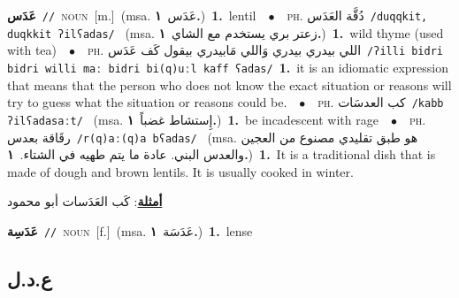\documentclass[10pt,a4paper,twoside]{article} %
\begin{document}
\begin{multicols}{2}
{\setlength\topsep{0pt}\textbf{\foreignlanguage{arabic}{عَدَس}}\ {\color{gray}\texttt{//}\color{black}}\ \textsc{noun}\ [m.]\ \color{gray}(msa. \foreignlanguage{arabic}{عَدَس}~\foreignlanguage{arabic}{\textbf{١.}})\color{black}\ \textbf{1.}~lentil\ \ $\bullet$\ \ \textsc{ph.} \color{gray} \foreignlanguage{arabic}{دُقَّة العَدَس}\color{black}\ {\color{gray}\texttt{/{\sffamily duqqkit, duqkkit ʔilʕadas}/}\color{black}}\ \color{gray} (msa. \foreignlanguage{arabic}{زعتر بري يستخدم مع الشاي}~\foreignlanguage{arabic}{\textbf{١.}})\color{black}\ \textbf{1.}~wild thyme (used with tea)\ \ $\bullet$\ \ \textsc{ph.} \color{gray} \foreignlanguage{arabic}{اللي بيدري بيدري وَاللي مَابيدري بيقول كَف عَدَس}\color{black}\ {\color{gray}\texttt{/{\sffamily ʔilli bidri bidri willi maː bidri bi(q)uːl kaff ʕadas}/}\color{black}}\ \textbf{1.}~it is an idiomatic expression that means that the person who does not know the exact situation or reasons will try to guess what the situation or reasons could be.\ \ $\bullet$\ \ \textsc{ph.} \color{gray} \foreignlanguage{arabic}{كب العدسَات}\color{black}\ {\color{gray}\texttt{/{\sffamily kabb ʔilʕadasaːt}/}\color{black}}\ \color{gray} (msa. \foreignlanguage{arabic}{إِستشاط غضباً}~\foreignlanguage{arabic}{\textbf{١.}})\color{black}\ \textbf{1.}~be incadescent with rage\ \ $\bullet$\ \ \textsc{ph.} \color{gray} \foreignlanguage{arabic}{رقَاقة بعدس}\color{black}\ {\color{gray}\texttt{/{\sffamily r(q)aː(q)a bʕadas}/}\color{black}}\ \color{gray} (msa. \foreignlanguage{arabic}{هو طبق تقليدي مصنوع من العجين والعدس البني. عادة ما يتم طهيه في الشتاء.}~\foreignlanguage{arabic}{\textbf{١.}})\color{black}\ \textbf{1.}~It is a traditional dish that is made of dough and brown lentils. It is usually cooked in winter.\  \begin{flushright}\color{gray}\foreignlanguage{arabic}{\textbf{\underline{\foreignlanguage{arabic}{أمثلة}}}: كَب العَدَسات أبو محمود}\end{flushright}\color{black}} \vspace{2mm}

{\setlength\topsep{0pt}\textbf{\foreignlanguage{arabic}{عَدَسِة}}\ {\color{gray}\texttt{//}\color{black}}\ \textsc{noun}\ [f.]\ \color{gray}(msa. \foreignlanguage{arabic}{عَدَسَة}~\foreignlanguage{arabic}{\textbf{١.}})\color{black}\ \textbf{1.}~lense\ } \vspace{2mm}

\vspace{-3mm}
\subsection*{\color{blue}\foreignlanguage{arabic}{ع.د.ل}\color{blue}{}} 


\end{multicols}
\end{document}
